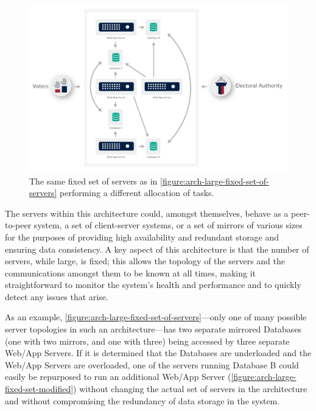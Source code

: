 \begin{figure}
\begin{center}
\includegraphics[width=5.5in]{architecture_resources/large-fixed-set-modified.pdf}
\end{center}
\vspace*{-3ex}
\caption{The same fixed set of servers as in
  \autoref{figure:arch-large-fixed-set-of-servers} performing a different
  allocation of tasks.}
\label{figure:arch-large-fixed-set-modified}
\end{figure}

The servers within this architecture could, amongst themselves, behave
as a peer-to-peer system, a set of client-server systems, or a set of
mirrors of various sizes for the purposes of providing high
availability and redundant storage and ensuring data consistency. A
key aspect of this architecture is that the number of servers, while
large, is fixed; this allows the topology of the servers and the
communications amongst them to be known at all times, making it
straightforward to monitor the system's health and performance and to
quickly detect any issues that arise.

As an example, \autoref{figure:arch-large-fixed-set-of-servers}---only
one of many possible server topologies in such an architecture---has
two separate mirrored Databases (one with two mirrors, and one with
three) being accessed by three separate Web/App Servers. If it is
determined that the Databases are underloaded and the Web/App Servers
are overloaded, one of the servers running Database B could easily be
repurposed to run an additional Web/App Server
(\autoref{figure:arch-large-fixed-set-modified}) without changing the
actual set of servers in the architecture and without compromising the
redundancy of data storage in the system.

